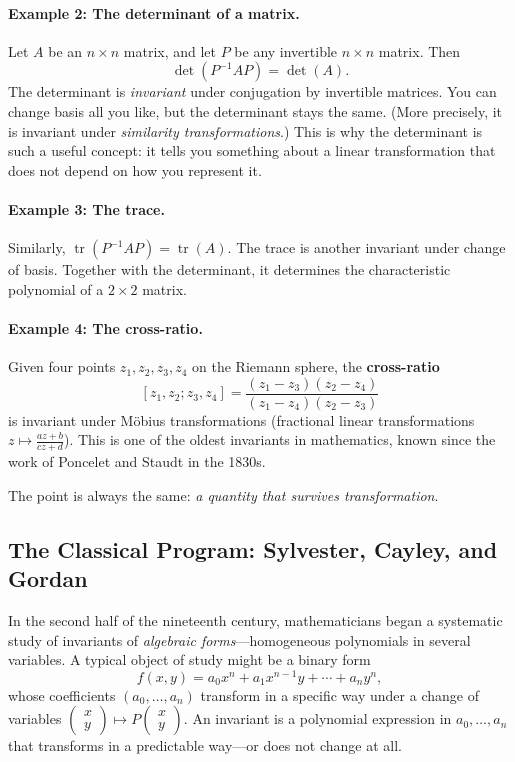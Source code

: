 \paragraph{Example 2: The determinant of a matrix.}
Let $A$ be an $n \times n$ matrix, and let $P$ be any invertible $n \times n$ matrix. Then
\[
    \det(P^{-1}AP) = \det(A).
\]
The determinant is \emph{invariant} under conjugation by invertible matrices. You can change basis all you like, but the determinant stays the same. (More precisely, it is invariant under \emph{similarity transformations}.) This is why the determinant is such a useful concept: it tells you something about a linear transformation that does not depend on how you represent it.

\paragraph{Example 3: The trace.}
Similarly, $\operatorname{tr}(P^{-1}AP) = \operatorname{tr}(A)$. The trace is another invariant under change of basis. Together with the determinant, it determines the characteristic polynomial of a $2 \times 2$ matrix.

\paragraph{Example 4: The cross-ratio.}
Given four points $z_1, z_2, z_3, z_4$ on the Riemann sphere, the \textbf{cross-ratio}
\[
    [z_1, z_2; z_3, z_4] = \frac{(z_1 - z_3)(z_2 - z_4)}{(z_1 - z_4)(z_2 - z_3)}
\]
is invariant under M\"obius transformations (fractional linear transformations $z \mapsto \frac{az+b}{cz+d}$). This is one of the oldest invariants in mathematics, known since the work of Poncelet and Staudt in the 1830s.

The point is always the same: \emph{a quantity that survives transformation}.

\subsection{The Classical Program: Sylvester, Cayley, and Gordan}

In the second half of the nineteenth century, mathematicians began a systematic study of invariants of \emph{algebraic forms}---homogeneous polynomials in several variables. A typical object of study might be a binary form
\[
    f(x,y) = a_0 x^n + a_1 x^{n-1} y + \cdots + a_n y^n,
\]
whose coefficients $(a_0, \ldots, a_n)$ transform in a specific way under a change of variables $\begin{pmatrix} x \\ y \end{pmatrix} \mapsto P \begin{pmatrix} x \\ y \end{pmatrix}$. An invariant is a polynomial expression in $a_0, \ldots, a_n$ that transforms in a predictable way---or does not change at all.

